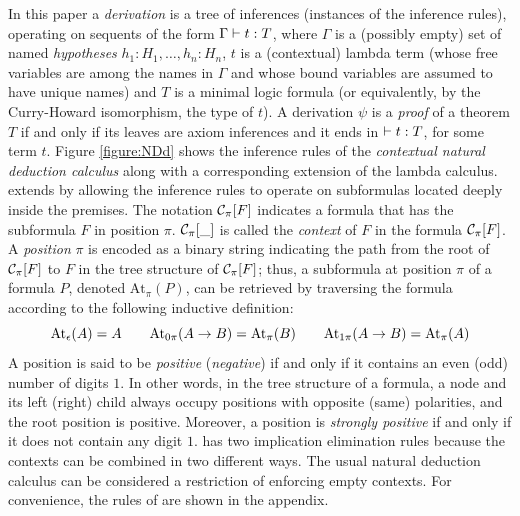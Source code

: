 \documentclass{llncs}
\newcommand{\eS}{\epsilon}
\newcommand{\AtPosition}{\textrm{At}}
\renewcommand{\defEq}{=}
\begin{document}
In this paper a \emph{derivation} is a tree of inferences (instances of the inference rules), operating on sequents of the form $\Gamma \vdash t: T$, where $\Gamma$ is a (possibly empty) set of named \emph{hypotheses} $h_1: H_1, \ldots, h_n: H_n$, $t$ is a (contextual) lambda term (whose free variables are among the names in $\Gamma$ and whose bound variables are assumed to have unique names) and $T$ is a minimal logic formula (or equivalently, by the Curry-Howard isomorphism, the type of $t$). A derivation $\psi$ is a \emph{proof} of a theorem $T$ if and only if its leaves are axiom inferences and it ends in $\vdash t: T$, for some term $t$. Figure \ref{figure:NDd} shows the inference rules of the \emph{contextual natural deduction calculus} {\NDd} along with a corresponding extension of the lambda calculus. {\NDd} extends {\ND} by allowing the inference rules to operate on subformulas located deeply inside the premises. The notation $\mathcal{C}_{\pi}[F]$ indicates a formula that has the subformula $F$ in position $\pi$. $\mathcal{C}_{\pi}[\_]$ is called the \emph{context} of $F$ in the formula $\mathcal{C}_{\pi}[F]$. A \emph{position} $\pi$ is encoded as a binary string indicating the path from the root of $\mathcal{C}_{\pi}[F]$ to $F$ in the tree structure of $\mathcal{C}_{\pi}[F]$; thus, a subformula at position $\pi$ of a formula $P$, denoted $\AtPosition_{\pi}(P)$, can be retrieved by traversing the formula according to the following inductive definition:
$$
\AtPosition_{\eS}(A) \defEq A 
\qquad
\AtPosition_{0\pi}(A \imp B) \defEq \AtPosition_{\pi}(B) 
\qquad
\AtPosition_{1\pi}(A \imp B) \defEq \AtPosition_{\pi}(A)
$$
A position is said to be \emph{positive} (\emph{negative}) if and only if it contains an even (odd) number of digits $1$. In other words, in the tree structure of a formula, a node and its left (right) child always occupy positions with opposite (same) polarities, and the root position is positive. Moreover, a position is \emph{strongly positive} if and only if it does not contain any digit $1$. {\NDd} has two implication elimination rules because the contexts can be combined in two different ways. The usual natural deduction calculus {\ND} can be considered a restriction of {\NDd} enforcing empty contexts. For convenience, the rules of {\ND} are shown in the appendix.
\end{document}
